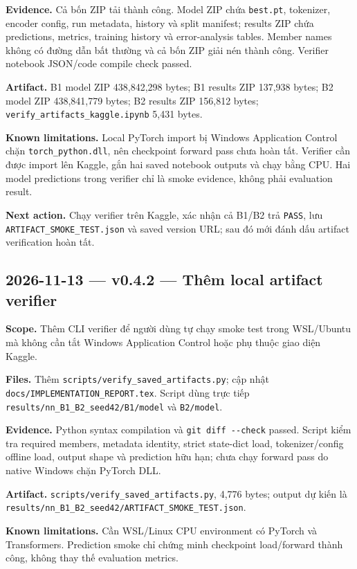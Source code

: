 \documentclass[11pt,a4paper]{article}
\newcommand{\code}[1]{\nolinkurl{#1}}
\begin{document}
\textbf{Evidence.} Cả bốn ZIP tải thành công. Model ZIP chứa \code{best.pt}, tokenizer, encoder config, run metadata, history và split manifest; results ZIP chứa predictions, metrics, training history và error-analysis tables. Member names không có đường dẫn bất thường và cả bốn ZIP giải nén thành công. Verifier notebook JSON/code compile check passed.

\textbf{Artifact.} B1 model ZIP 438,842,298 bytes; B1 results ZIP 137,938 bytes; B2 model ZIP 438,841,779 bytes; B2 results ZIP 156,812 bytes; \code{verify_artifacts_kaggle.ipynb} 5,431 bytes.

\textbf{Known limitations.} Local PyTorch import bị Windows Application Control chặn \code{torch_python.dll}, nên checkpoint forward pass chưa hoàn tất. Verifier cần được import lên Kaggle, gắn hai saved notebook outputs và chạy bằng CPU. Hai model predictions trong verifier chỉ là smoke evidence, không phải evaluation result.

\textbf{Next action.} Chạy verifier trên Kaggle, xác nhận cả B1/B2 trả \code{PASS}, lưu \code{ARTIFACT_SMOKE_TEST.json} và saved version URL; sau đó mới đánh dấu artifact verification hoàn tất.

\subsection*{2026-11-13 --- v0.4.2 --- Thêm local artifact verifier}

\textbf{Scope.} Thêm CLI verifier để người dùng tự chạy smoke test trong WSL/Ubuntu mà không cần tắt Windows Application Control hoặc phụ thuộc giao diện Kaggle.

\textbf{Files.} Thêm \code{scripts/verify_saved_artifacts.py}; cập nhật \code{docs/IMPLEMENTATION_REPORT.tex}. Script dùng trực tiếp \code{results/nn_B1_B2_seed42/B1/model} và \code{B2/model}.

\textbf{Evidence.} Python syntax compilation và \code{git diff --check} passed. Script kiểm tra required members, metadata identity, strict state-dict load, tokenizer/config offline load, output shape và prediction hữu hạn; chưa chạy forward pass do native Windows chặn PyTorch DLL.

\textbf{Artifact.} \code{scripts/verify_saved_artifacts.py}, 4,776 bytes; output dự kiến là \code{results/nn_B1_B2_seed42/ARTIFACT_SMOKE_TEST.json}.

\textbf{Known limitations.} Cần WSL/Linux CPU environment có PyTorch và Transformers. Prediction smoke chỉ chứng minh checkpoint load/forward thành công, không thay thế evaluation metrics.
\end{document}
